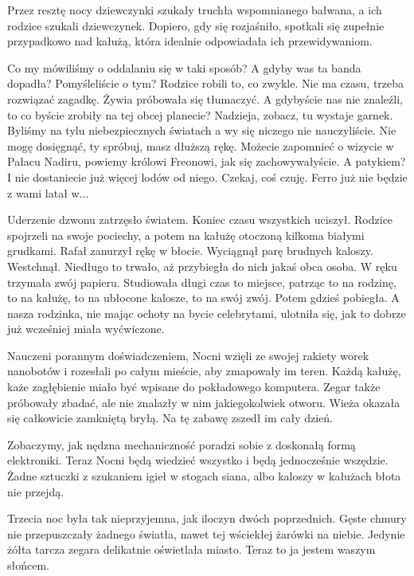 Przez resztę nocy dziewczynki szukały truchła wspomnianego bałwana, a ich rodzice szukali dziewczynek.
Dopiero, gdy się rozjaśniło, spotkali się zupełnie przypadkowo nad kałużą, która idealnie odpowiadała ich przewidywaniom.
\begin{dialogue}
	\ds{} Co my mówiliśmy o oddalaniu się w taki sposób?
	\ds{} A gdyby was ta banda dopadła? Pomyśleliście o tym? \dm{} Rodzice robili to, co zwykle.
	\ds{} Nie ma czasu, trzeba rozwiązać zagadkę. \dm{} Żywia próbowała się tłumaczyć.
	\ds{} A gdybyście nas nie znaleźli, to co byście zrobiły na tej obcej planecie?
	\ds{} Nadzieja, zobacz, tu wystaje garnek.
	\ds{} Byliśmy na tylu niebezpiecznych światach a wy się niczego nie nauczyliście.
	\ds{} Nie mogę dosięgnąć, ty spróbuj, masz dłuższą rękę.
	\ds{} Możecie zapomnieć o wizycie w Pałacu Nadiru, powiemy królowi Freonowi, jak się zachowywałyście.
	\ds{} A patykiem?
	\ds{} I nie dostaniecie już więcej lodów od niego.
	\ds{} Czekaj, coś czuję.
	\ds{} Ferro już nie będzie z wami latał w...
\end{dialogue}

Uderzenie dzwonu zatrzęsło światem.
Koniec czasu wszystkich uciszył.
Rodzice spojrzeli na swoje pociechy, a potem na kałużę otoczoną kilkoma białymi grudkami.
Rafał zanurzył rękę w błocie.
Wyciągnął parę brudnych kaloszy.
Westchnął.
Niedługo to trwało, aż przybiegła do nich jakaś obca osoba. W ręku trzymała zwój papieru.
Studiowała długi czas to miejsce, patrząc to na rodzinę, to na kałużę, to na ubłocone kalosze, to na swój zwój.
Potem gdzieś pobiegła.
A nasza rodzinka, nie mając ochoty na bycie celebrytami, ulotniła się, jak to dobrze już wcześniej miała wyćwiczone.

Nauczeni porannym doświadczeniem, Nocni wzięli ze swojej rakiety worek nanobotów i rozesłali po całym mieście, aby zmapowały im teren. Każdą kałużę, każe zagłębienie miało być wpisane do pokładowego komputera.
Zegar także próbowały zbadać, ale nie znalazły w nim jakiegokolwiek otworu. 
Wieża okazała się całkowicie zamkniętą bryłą.
Na tę zabawę zszedł im cały dzień.

Zobaczymy, jak nędzna mechaniczność poradzi sobie z doskonałą formą elektroniki.
Teraz Nocni będą wiedzieć wszystko i będą jednocześnie wszędzie.
Żadne sztuczki z szukaniem igieł w stogach siana, albo kaloszy w kałużach błota nie przejdą.

Trzecia noc była tak nieprzyjemna, jak iloczyn dwóch poprzednich.
Gęste chmury nie przepuszczały żadnego światła, nawet tej wściekłej żarówki na niebie.
Jedynie żółta tarcza zegara delikatnie oświetlała miasto.
Teraz to ja jestem waszym słońcem.

